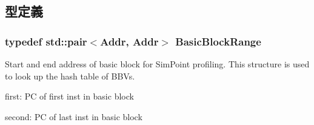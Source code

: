 \subsection{型定義}
\hypertarget{atomic_8hh_aa63e4e0e926d882e71c1af09578986e1}{
\subsubsection[{BasicBlockRange}]{\setlength{\rightskip}{0pt plus 5cm}typedef {\bf std::pair}$<${\bf Addr}, {\bf Addr}$>$ {\bf BasicBlockRange}}}
\label{atomic_8hh_aa63e4e0e926d882e71c1af09578986e1}
Start and end address of basic block for SimPoint profiling. This structure is used to look up the hash table of BBVs.
\begin{DoxyItemize}
\item first: PC of first inst in basic block
\item second: PC of last inst in basic block 
\end{DoxyItemize}